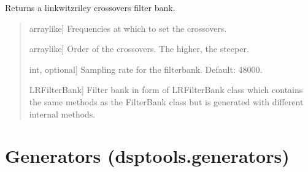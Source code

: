 \documentclass[letterpaper,10pt,english]{sphinxmanual}
\begin{document}
\begin{fulllineitems}
\label{\detokenize{modules/dsptools.filterbanks:dsptools.filterbanks.linkwitz_riley_crossovers}}
\pysigstartsignatures
{}
\pysigstopsignatures
\sphinxAtStartPar
Returns a linkwitz\sphinxhyphen{}riley crossovers filter bank.
\begin{quote}\begin{description}
\begin{description}
\sphinxlineitem{\sphinxstylestrong{freqs}}{[}array\sphinxhyphen{}like{]}
\sphinxAtStartPar
Frequencies at which to set the crossovers.

\sphinxlineitem{\sphinxstylestrong{order}}{[}array\sphinxhyphen{}like{]}
\sphinxAtStartPar
Order of the crossovers. The higher, the steeper.

\sphinxlineitem{\sphinxstylestrong{sampling\_rate\_hz}}{[}int, optional{]}
\sphinxAtStartPar
Sampling rate for the filterbank. Default: 48000.

\end{description}

\begin{description}
\sphinxlineitem{\sphinxstylestrong{fb}}{[}LRFilterBank{]}
\sphinxAtStartPar
Filter bank in form of LRFilterBank class which contains the same
methods as the FilterBank class but is generated with different
internal methods.

\end{description}

\end{description}\end{quote}

\end{fulllineitems}


\sphinxstepscope


\section{Generators (dsptools.generators)}
\label{\detokenize{modules/dsptools.generators:module-dsptools.generators}}\label{\detokenize{modules/dsptools.generators:generators-dsptools-generators}}\label{\detokenize{modules/dsptools.generators::doc}}
\end{document}
